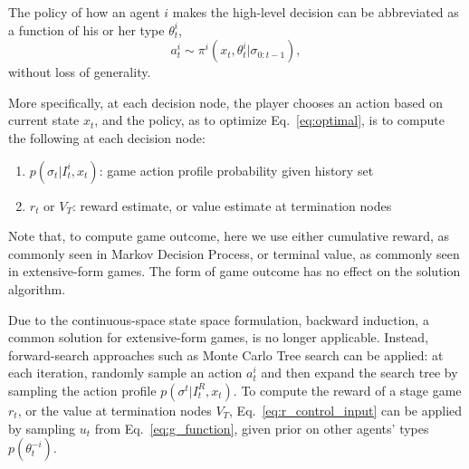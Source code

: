 \documentclass[letterpaper, 10 pt, conference]{ieeeconf}  %
\begin{document}
The policy of how an agent $i$ makes the high-level decision can be 
abbreviated as a function of his or her type $\theta^i_t$,
\begin{equation}
a^i_t \sim \pi^i(x_t,\theta^i_t|\sigma_{0:t-1}),
\end{equation}
without loss of generality.



More specifically, at each decision node, the player chooses an action based on current state $x_t$, and the policy, as to optimize Eq.~\ref{eq:optimal}, is to 
compute the following at each decision node:
\begin{enumerate}
  \item $p(\sigma_{t}|I^i_t,x_t)$: game action profile probability given history set
  \item $r_{t}$ or $V_T$: 
    reward estimate, or value estimate at termination nodes
\end{enumerate}
Note that, to compute game outcome, here we use either cumulative reward, as 
commonly seen in Markov Decision Process, or terminal value, as commonly seen 
in extensive-form games. The form of game outcome has no effect on the 
solution algorithm.  

Due to the continuous-space state space formulation, backward induction, a common 
solution for extensive-form games, is no longer applicable. Instead, 
forward-search approaches such as Monte Carlo Tree search can be applied: at 
each iteration, randomly sample an action $a^i_t$ and then expand the search 
tree by sampling the action profile 
$p(\sigma^t|I^R_t,x_t)$. To 
compute the reward of a stage game $r_t$, or the value at termination nodes $V_T$, Eq.~\ref{eq:r_control_input} can be applied by sampling $u_t$ from 
Eq.~\ref{eq:g_function}, given prior on other agents' types $p(\theta^{-i}_t)$. 

\end{document}
